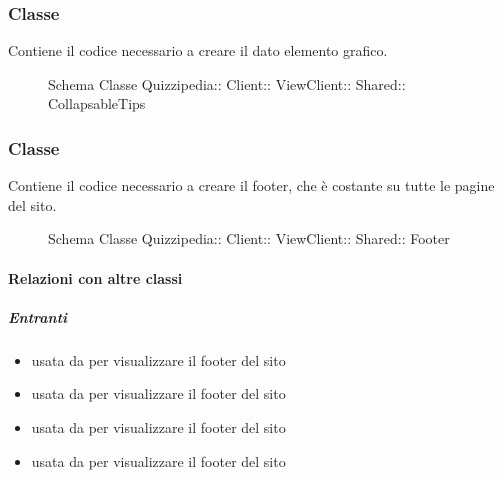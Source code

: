 \subsubsection{Classe }
Contiene il codice necessario a creare il dato elemento grafico.
\begin{figure}[H]
\centering
\noindent{}
\caption[Schema Classe CollapsableTips]{Schema Classe Quizzipedia:: Client:: ViewClient:: Shared:: CollapsableTips}
\end{figure}
\subsubsection{Classe }
Contiene il codice necessario a creare il footer, che è costante su tutte le pagine del sito.
\begin{figure}[H]
\centering
\noindent{}
\caption[Schema Classe Footer]{Schema Classe Quizzipedia:: Client:: ViewClient:: Shared:: Footer}
\end{figure}
\paragraph{Relazioni con altre classi}
\subparagraph{Entranti}
\begin{itemize}
\item usata da  per visualizzare il footer del sito
\item usata da  per visualizzare il footer del sito
\item usata da  per visualizzare il footer del sito
\item usata da  per visualizzare il footer del sito
\end{itemize}
